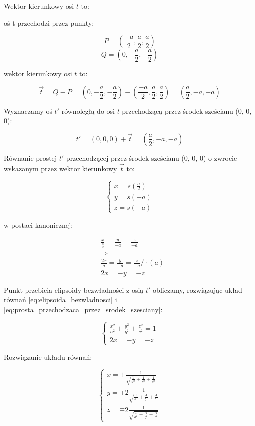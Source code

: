 \documentclass[a4paper,12pt]{article}
\begin{document}
Wektor kierunkowy osi $t$ to:

oś t przechodzi przez punkty:

$$
    P = (\frac{-a}{2}, \frac{a}{2}, \frac{a}{2})
$$
$$
    Q = (0, -\frac{a}{2}, -\frac{a}{2})
$$

wektor kierunkowy osi $t$ to:

$$
    \vec{t} = Q - P = (0, -\frac{a}{2}, -\frac{a}{2}) - (\frac{-a}{2}, \frac{a}{2}, \frac{a}{2}) = (\frac{a}{2}, -a, -a)
$$


Wyznaczamy oś $t'$ równoległą do osi $t$ przechodzącą przez środek sześcianu (0, 0, 0):

$$
    t' = (0, 0, 0) + \vec{t} = (\frac{a}{2}, -a, -a)
$$



Równanie prostej $t'$ przechodzącej przez środek sześcianu (0, 0, 0) o zwrocie wskazanym przez wektor kierunkowy $\vec{t}$ to:

$$
    \begin{cases}
        x = s(\frac{a}{2}) \\
        y = s(-a)          \\
        z = s(-a)
    \end{cases}
$$

w postaci kanonicznej:

\begin{align*}
     & \frac{x}{\frac{a}{2}} = \frac{y}{-a} = \frac{z}{-a}    \\
     & \Rightarrow                                            \\
     & \frac{2x}{a} = \frac{y}{-a} = \frac{z}{-a} / \cdot (a) \\
     & 2x = -y = -z
\end{align*}

Punkt przebicia elipsoidy bezwładności z osią $t'$ obliczamy, rozwiązując układ równań \eqref{eq:elipsoida_bezwladnosci} i \eqref{eq:prosta_przechodzaca_przez_srodek_szesciany}:



$$
    \begin{cases}
        \frac{x^2}{a^2} + \frac{y^2}{b^2} + \frac{z^2}{c^2} = 1 \\
        2x = -y = -z
    \end{cases}
$$


Rozwiązanie układu równań:


\[
    \begin{cases}
        x = \pm\frac{1}{\sqrt{\frac{1}{a^2} + \frac{4}{b^2} + \frac{4}{c^2}}}  \\
        y = \mp2\frac{1}{\sqrt{\frac{1}{a^2} + \frac{4}{b^2} + \frac{4}{c^2}}} \\
        z = \mp2\frac{1}{\sqrt{\frac{1}{a^2} + \frac{4}{b^2} + \frac{4}{c^2}}}
    \end{cases}
\]
\end{document}
